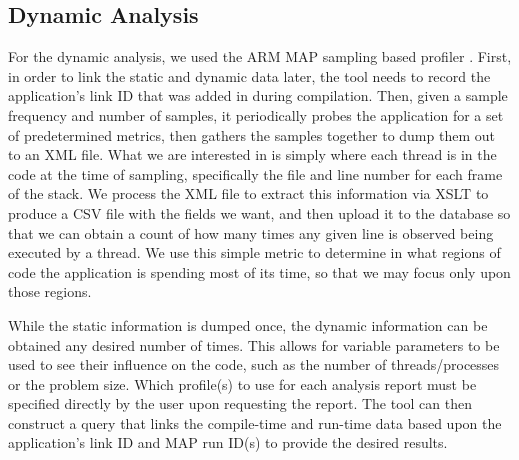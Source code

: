 \subsection{Dynamic Analysis}
\label{sec:dynamic}
For the dynamic analysis, we used the ARM MAP sampling based profiler \cite{arm-docs}.
First, in order to link the static and dynamic data later, the tool needs to record the application's link ID that was added in during compilation.
Then, given a sample frequency and number of samples, it periodically probes the application for a set of predetermined metrics, then gathers the samples together to dump them out to an \acs{XML} file.
What we are interested in is simply where each thread is  in the code at the time of sampling,
specifically the file and line number for each frame of the stack.
We process the \acs{XML} file to extract this information via \ac{XSLT} to produce a \acs{CSV} file with the fields we want, and then upload it to the database so that we can obtain a count of how many times any given line is observed being executed by a thread.
We use this simple metric to determine in what regions of code the application is spending most of its time, so that we may focus only upon those regions.

While the static information is dumped once, the dynamic information can be obtained any desired number of times.
This allows for variable parameters to be used to see their influence on the code, such as the number of threads/processes or the problem size.
Which profile(s) to use for each analysis report must be specified directly by the user upon requesting the report.
The tool can then construct a query that links the compile-time and run-time data based upon the application's link ID and MAP run ID(s) to provide the desired results.

